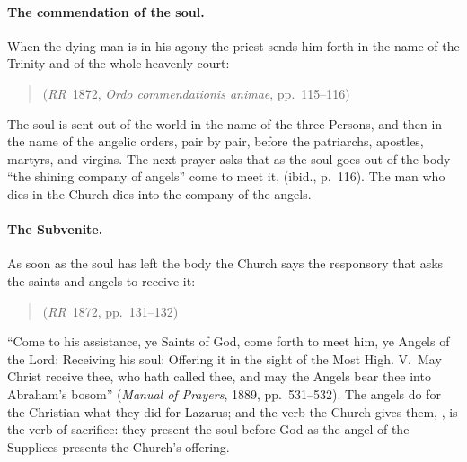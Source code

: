 \paragraph{The commendation of the soul.} When the dying man is in his
agony the priest sends him forth in the name of the Trinity and of the
whole heavenly court:
\begin{quote}
 (\emph{RR}~1872,
\emph{Ordo commendationis animae}, pp.~115--116)
\end{quote}
The soul is sent out of the world in the name of the three Persons, and
then in the name of the angelic orders, pair by pair, before the
patriarchs, apostles, martyrs, and virgins. The next prayer asks that as
the soul goes out of the body ``the shining company of angels'' come to
meet it,  (ibid., p.~116).
The man who dies in the Church dies into the company of the angels.

\paragraph{The Subvenite.} As soon as the soul has left the body the
Church says the responsory that asks the saints and angels to receive it:
\begin{quote}
 (\emph{RR}~1872,
pp.~131--132)
\end{quote}
``Come to his assistance, ye Saints of God, come forth to meet him, ye
Angels of the Lord: Receiving his soul: Offering it in the sight of the
Most High. V.~May Christ receive thee, who hath called thee, and may the
Angels bear thee into Abraham's bosom'' (\emph{Manual of Prayers}, 1889,
pp.~531--532). The angels do for the Christian what they did for Lazarus;
and the verb the Church gives them, , is the verb of
sacrifice: they present the soul before God as the angel of the
Supplices presents the Church's offering.

